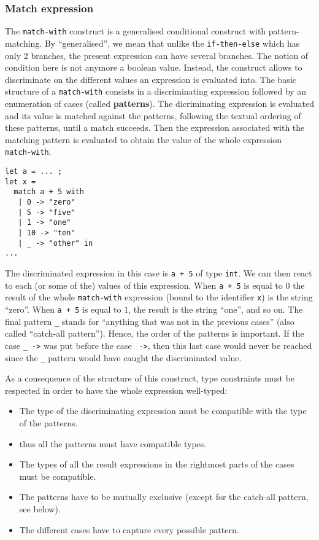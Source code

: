 \subsubsection{Match expression}
  

The {\tt match-with} construct is a generalised conditional construct
with pattern-matching. By ``generalised'', we mean that unlike the
{\tt if-then-else} which has only 2 branches, the present expression
can have several branches. The notion of condition here is not anymore
a boolean value. Instead, the construct allows to discriminate on the
different values an expression is evaluated into. The basic structure
of a {\tt match-with} consists in a discriminating expression followed
by an enumeration of cases (called {\bf patterns}). The dicriminating
expression is evaluated and its value is matched against the patterns,
following the textual ordering of these patterns, until a match
succeeds. Then the expression associated with the matching pattern is
evaluated to obtain the value of the whole expression {\tt
  match-with}.


{\scriptsize
\begin{lstlisting}
let a = ... ;
let x =
  match a + 5 with
   | 0 -> "zero"
   | 5 -> "five"
   | 1 -> "one"
   | 10 -> "ten"
   | _ -> "other" in
...
\end{lstlisting}
} The discriminated expression in this case is {\tt a + 5} of type
{\tt int}. We can then react to each (or some of the) values of this
expression. When {\tt a + 5}  is equal to $0$ the result of the
whole {\tt match-with} expression (bound to the identifier {\tt x}) is
the string ``zero''. When {\tt a + 5} is equal to $1$, the result is the string
``one'', and so on. The final pattern {\tt \_} stands for ``anything
that was not in the previous cases'' (also called ``catch-all
pattern''). Hence, the order of the patterns is important. If the
case {\tt \vertical \_ ->} was put before the case {\tt {} ->},
then this last case would never be reached since the {\tt \_} pattern
would have caught the discriminated value.



\smallskip
As a consequence of the structure of this construct, type constraints
must be respected in order to have the whole expression well-typed:
\begin{itemize}
  \item The type of the discriminating expression must be compatible with the
    type of the patterns.
  \item thus all the patterns must have compatible
    types.
  \item The types of all the result expressions in the rightmost parts
    of the cases must be compatible.
  \item The patterns have to be mutually exclusive (except for the catch-all
        pattern, see below).
  \item The different cases have to capture every possible pattern.
\end{itemize}

